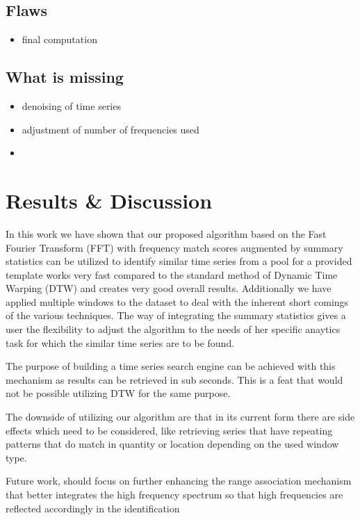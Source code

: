 \documentclass[phd,black, hidelinks]{PrincetonThesis}
\begin{document}
\section{Flaws}
\label{sec:org1cf00a9}
\begin{itemize}
\item final computation
\end{itemize}
\section{What is missing}
\label{sec:org7f0423b}
\begin{itemize}
\item denoising of time series
\item adjustment of number of frequencies used
\item 
\end{itemize}
\chapter{Results \& Discussion}
\label{sec:org547692c}
In this work we have shown that our proposed algorithm based on the Fast Fourier Transform (FFT) with frequency match scores augmented by summary statistics can be utilized to identify similar time series from a pool for a provided template works very fast compared to the standard method of Dynamic Time Warping (DTW) and creates very good overall results. Additionally we have applied multiple windows to the dataset to deal with the inherent short comings of the various techniques. The way of integrating the summary statistics gives a user the flexibility to adjust the algorithm to the needs of her specific anaytics task for which the similar time series are to be found.

The purpose of building a time series search engine can be achieved with this mechanism as results can be retrieved in sub seconds. This is a feat that would not be possible utilizing DTW for the same purpose.

The downside of utilizing our algorithm are that in its current form there are side effects which need to be considered, like retrieving series that have repeating patterns that do match in quantity or location depending on the used window type.

Future work, should focus on further enhancing the range association mechanism that better integrates the high frequency spectrum so that high frequencies are reflected accordingly in the identification 
\end{document}

